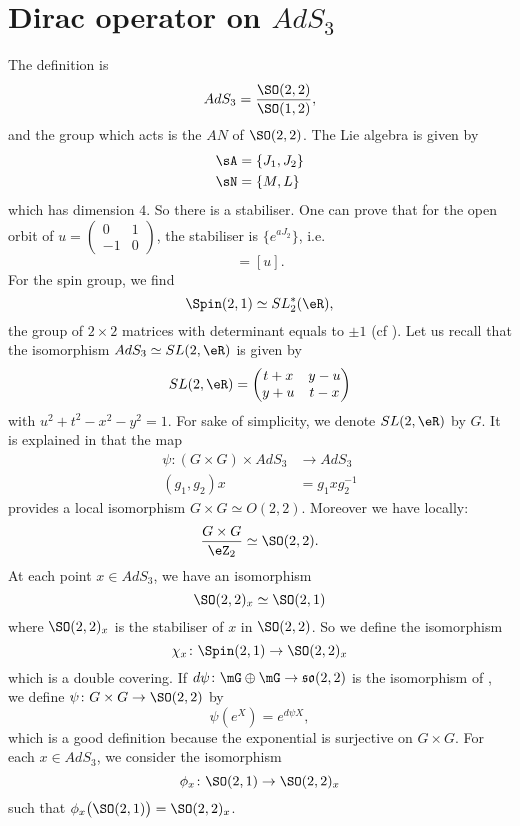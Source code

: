 
\section{Dirac operator on \texorpdfstring{$AdS_{3}$}{AdS3}}  \label{PgDiracAdSTrois}

The definition is 
\[ 
  AdS_{3}=\frac{ \SO(2,2) }{ \SO(1,2) },
\]
and the group which acts is the $AN$ of $\SO(2,2)$. The Lie algebra is given by
\[ 
\begin{split}
  \sA&=\{ J_{1},J_{2} \}\\
  \sN&=\{ M,L \}
\end{split}  
\]
which has dimension $4$. So there is a stabiliser. One can prove that for the open orbit of $u=\begin{pmatrix}
0&1\\-1&0
\end{pmatrix}$, the stabiliser is $\{  e^{aJ_{2}} \}$, i.e.
\begin{equation}
  [ e^{aJ_{2}}u]=[u].
\end{equation}
For the spin group, we find 
\[ 
  \Spin(2,1)\simeq SL_2^*(\eR),
\]
the group of $2\times 2$ matrices with determinant equals to $\pm 1$ (cf \cite{Michelson}). Let us recall that the isomorphism $AdS_{3}\simeq SL(2,\eR)$ is given by
\[ 
  SL(2,\eR)=\begin{pmatrix}
t+x&y-u\\
y+u&t-x
\end{pmatrix}
\]
with $u^{2}+t^{2}-x^{2}-y^{2}=1$. For sake of simplicity, we denote $SL(2,\eR)$ by $G$. It is explained in \cite{Clement} that the map
\begin{equation}
\begin{aligned}
 \psi\colon (G\times G)\times AdS_{3}&\to AdS_3 \\ 
(g_{1},g_{2})x&= g_{1}xg_{2}^{-1} 
\end{aligned}
\end{equation}
provides a local isomorphism $G\times G\simeq O(2,2)$. Moreover we have locally:
\[ 
  \frac{ G\times G }{ \eZ_{2} }\simeq \SO(2,2).
\]
At each point $x\in AdS_3$, we have an isomorphism
\[ 
  \SO(2,2)_{x}\simeq \SO(2,1)
\]
where $\SO(2,2)_{x}$ is the stabiliser of $x$ in $\SO(2,2)$. So we define the isomorphism
\[ 
  \chi_{x}\colon \Spin(2,1)\to \SO(2,2)_{x}
\]
which is a double covering. If $d\psi\colon \mG\oplus\mG\to \mathfrak{so}(2,2)$ is the isomorphism of \cite{Clement}, we define $\psi\colon G\times G\to \SO(2,2)$ by
\[ 
  \psi( e^{X})= e^{d\psi X},
\]
which is a good definition because the exponential is surjective on $G\times G$. For each $x\in AdS_3$, we consider the isomorphism
\[ 
  \phi_{x}\colon \SO(2,1)\to \SO(2,2)_{x}
\]
such that $\phi_{x}\big( \SO(2,1) \big)=\SO(2,2)_{x}$.

